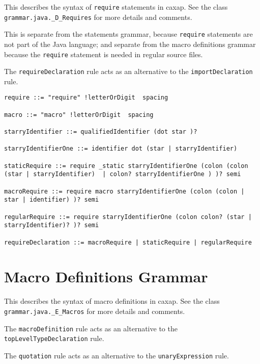 This describes the syntax of \texttt{require} statements in caxap. See the class
\texttt{grammar.java._D_Requires} for more details and comments.

This is separate from the statements grammar, because \texttt{require}
statements are not part of the Java language; and separate from the macro
definitions grammar because the \texttt{require} statement is needed in regular
source files.

The \texttt{requireDeclaration} rule acts as an alternative to the
\texttt{importDeclaration} rule.

\hrulefill

\begin{lstlisting}[breaklines=true]
require ::= "require" !letterOrDigit  spacing

macro ::= "macro" !letterOrDigit  spacing

starryIdentifier ::= qualifiedIdentifier (dot star )?

starryIdentifierOne ::= identifier dot (star | starryIdentifier)

staticRequire ::= require _static starryIdentifierOne (colon (colon (star | starryIdentifier)  | colon? starryIdentifierOne ) )? semi

macroRequire ::= require macro starryIdentifierOne (colon (colon | star | identifier) )? semi

regularRequire ::= require starryIdentifierOne (colon colon? (star | starryIdentifier)? )? semi

requireDeclaration ::= macroRequire | staticRequire | regularRequire

\end{lstlisting}

\section{Macro Definitions Grammar}
\label{macrodefinitions_grammar}

This describes the syntax of macro definitions in caxap. See the class
\texttt{grammar.java._E_Macros} for more details and comments.

The \texttt{macroDefinition} rule acts as an alternative to the
\texttt{topLevelTypeDeclaration} rule.

The \texttt{quotation} rule acts as an alternative to the
\texttt{unaryExpression} rule.

\hrulefill

